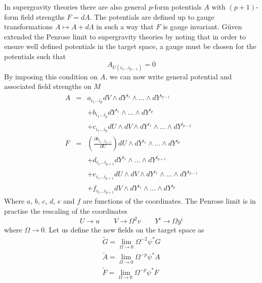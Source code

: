 \documentclass[11pt, a4paper, titlepage]{article}
\begin{document}
In supergravity theories there are also general $p$-form potentials $A$ with
$(p+1)$-form field strengths $F=dA$. The potentials are defined up to gauge
transformations $A\mapsto A+d\Lambda$ in such a way that $F$ is gauge invariant.
G\"{u}ven extended the Penrose limit to supergravity theories by noting that in
order to ensure well defined potentials in the target space, a gauge must be
chosen for the potentials such that
\begin{equation}
  \label{eq:bpg:guven}
  A_{U(i_1\ldots i_{p-1})}=0
\end{equation}
By imposing this condition on $A$, we can now write general potential and
associated field strengths on $M$
\begin{eqnarray}
  \label{eq:bpg:initial:A}
  A &=& a_{i_1 \ldots i_p} dV\wedge dY^{i_1}\wedge\ldots\wedge
  dY^{i_{p-1}} \\ \nonumber
  &&+b_{i_1\ldots i_p} dY^{i_1}\wedge\ldots\wedge dY^{i_p}\\ \nonumber
  &&+c_{i_1\ldots i_p} dU\wedge dV\wedge dY^{i_1}\wedge\ldots\wedge
  dY^{i_{p-2}} \\
  \label{eq:bpg:initial:F}
  F &=& \left( \frac{\partial b_{i_1 \ldots i_{p+1}}}{\partial U}
  \right) dU\wedge dY^{i_1}\wedge\ldots\wedge dY^{i_{p}} \\ \nonumber
  &&+ d_{i_1 \ldots i_{p+1}} dY^{i_1}\wedge\ldots\wedge dY^{i_{p+1}} \\ \nonumber
  &&+ e_{i_1 \ldots i_{p+1}} dU\wedge dV\wedge dY^{i_1}\wedge\ldots\wedge
  dY^{i_{p-1}} \\ \nonumber
  &&+ f_{i_1 \ldots i_{p+1}} dV\wedge dY^{i_1}\wedge\ldots\wedge dY^{i_{p}}  
\end{eqnarray}
Where $a$, $b$, $c$, $d$, $e$ and $f$ are functions of the coordinates. The
Penrose limit is in practise the rescaling of the coordinates
\begin{equation}
  \label{eq:bpg:rescale}
  U\rightarrow u\qquad V\rightarrow\Omega^2v\qquad Y^i\rightarrow\Omega y^i
\end{equation}
where $\Omega\rightarrow 0$. Let us define the new fields on the target space as
\begin{eqnarray}
  \label{eq:bpg:tildefields}
  \widetilde{G}=\lim_{\Omega\rightarrow 0} \Omega^{-2}\psi^*G \\ \nonumber
  \widetilde{A}=\lim_{\Omega\rightarrow 0} \Omega^{-p}\psi^*A \\ \nonumber
  \widetilde{F}=\lim_{\Omega\rightarrow 0} \Omega^{-p}\psi^*F
\end{eqnarray}
\end{document}
